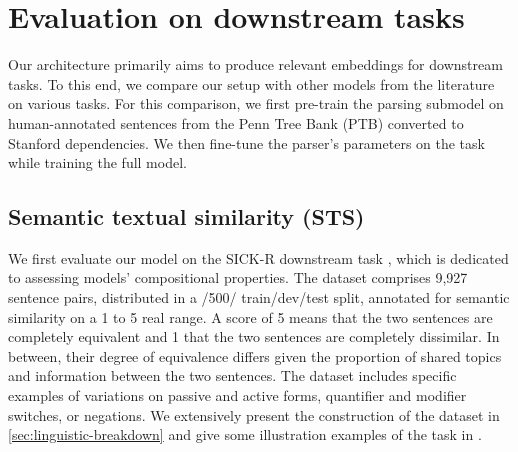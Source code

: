 \section{Evaluation on downstream tasks}

Our architecture primarily aims to produce relevant embeddings for downstream tasks. To this end, we compare our setup with other models from the literature on various tasks. For this comparison, we first pre-train the parsing submodel on human-annotated sentences from the Penn Tree Bank (PTB) \parencite{marcus_94} converted to Stanford dependencies. We then fine-tune the parser's parameters on the task while training the full model.


\subsection{Semantic textual similarity (STS)}

We first evaluate our model on the SICK-R downstream task \parencite{marelli_14}, which is dedicated to assessing models' compositional properties. 
The dataset comprises 9,927 sentence pairs, distributed in a /500/ train/dev/test split, annotated for semantic similarity on a 1 to 5 real range. A score of 5 means that the two sentences are completely equivalent and 1 that the two sentences are completely dissimilar. In between, their degree of equivalence differs given the proportion of shared topics and information between the two sentences. The dataset includes specific examples of variations on passive and active forms, quantifier and modifier switches, or negations. We extensively present the construction of the dataset in \ref{sec:linguistic-breakdown} and give some illustration examples of the task in .

